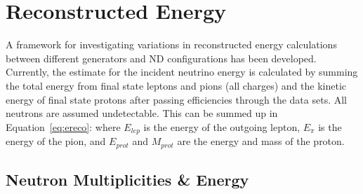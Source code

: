 \documentclass[12pt]{article}
\begin{document}
\section{Reconstructed Energy}\label{sec:Reco}

A framework for investigating variations in reconstructed energy calculations between different generators and ND configurations has been developed. %
Currently, the estimate for the incident neutrino energy is calculated by summing the total energy from final state leptons and pions (all charges) and the kinetic energy of final state protons after passing efficiencies through the data sets. All neutrons are assumed undetectable. 
This can be summed up in Equation~\ref{eq:ereco}:
where $E_{lep}$ is the energy of the outgoing lepton, $E_{\pi}$ is the energy of the pion, and $E_{prot}$ and $M_{prot}$ are the energy and mass of the proton.




\subsection{Neutron Multiplicities \& Energy}
\label{subsec:N_multiplicities_Energy}
\end{document}
